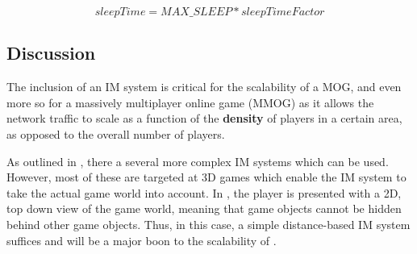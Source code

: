 \begin{equation}
    sleepTime = MAX\_SLEEP * sleepTimeFactor
\end{equation}

\subsection{Discussion}
The inclusion of an IM system is critical for the scalability of a MOG, and even more so for a massively multiplayer online game (MMOG) as it allows the network traffic to scale as a function of the \textbf{density} of players in a certain area, as opposed to the overall number of players.

As outlined in , there a several more complex IM systems which can be used. However, most of these are targeted at 3D games which enable the IM system to take the actual game world into account. In \game{}, the player is presented with a 2D, top down view of the game world, meaning that game objects cannot be hidden behind other game objects. Thus, in this case, a simple distance-based IM system suffices and will be a major boon to the scalability of \game{}.
